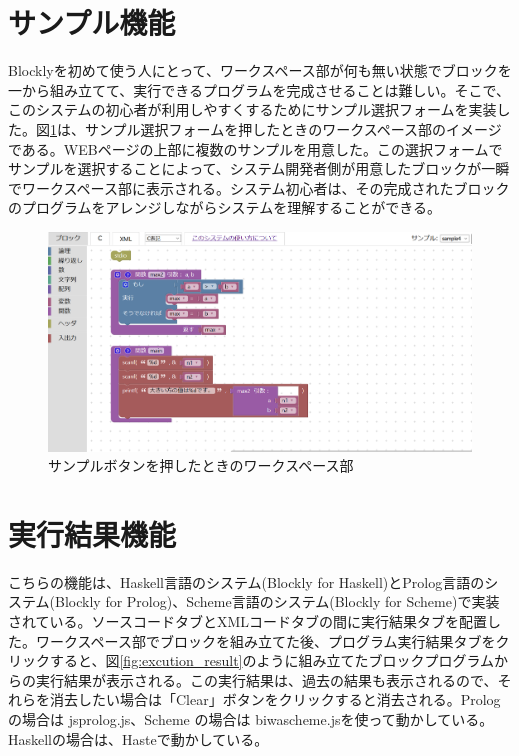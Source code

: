 \documentclass{risepaper}
\begin{document}
   \section{サンプル機能}
Blocklyを初めて使う人にとって、ワークスペース部が何も無い状態でブロックを一から組み立てて、実行できるプログラムを完成させることは難しい。そこで、このシステムの初心者が利用しやすくするためにサンプル選択フォームを実装した。図\ref{fig:sample}は、サンプル選択フォームを押したときのワークスペース部のイメージである。WEBページの上部に複数のサンプルを用意した。この選択フォームでサンプルを選択することによって、システム開発者側が用意したブロックが一瞬でワークスペース部に表示される。システム初心者は、その完成されたブロックのプログラムをアレンジしながらシステムを理解することができる。

\begin{figure}[h]
\begin{center}
\includegraphics[scale=0.5]{img/sample.PNG}
\caption{サンプルボタンを押したときのワークスペース部}%
\label{fig:sample}
\end{center}%
\end{figure}%

   \section{実行結果機能}
   
こちらの機能は、Haskell言語のシステム(Blockly for Haskell)とProlog言語のシステム(Blockly for Prolog)、Scheme言語のシステム(Blockly for Scheme)で実装されている。ソースコードタブとXMLコードタブの間に実行結果タブを配置した。ワークスペース部でブロックを組み立てた後、プログラム実行結果タブをクリックすると、図\ref{fig:excution_result}のように組み立てたブロックプログラムからの実行結果が表示される。この実行結果は、過去の結果も表示されるので、それらを消去したい場合は「Clear」ボタンをクリックすると消去される。Prolog の場合は jsprolog.js\cite{jsprolog}、Scheme の場合は biwascheme.js\cite{biwascheme}を使って動かしている。Haskellの場合は、Haste\cite{Haste}で動かしている。
\end{document}
